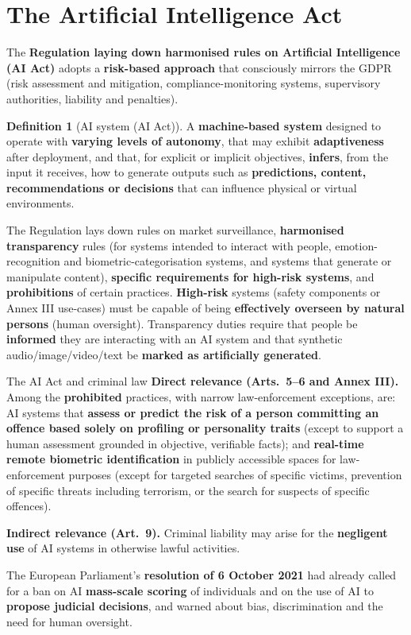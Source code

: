 \documentclass[11pt,a4paper,openany]{report}
\theoremstyle{definition}
\newtheorem{definition}{Definition}[chapter]
\theoremstyle{plain}
\theoremstyle{remark}
\begin{document}
\section{The Artificial Intelligence Act}

The \textbf{Regulation laying down harmonised rules on Artificial Intelligence (AI Act)} adopts a \textbf{risk-based approach} that consciously mirrors the GDPR (risk assessment and mitigation, compliance-monitoring systems, supervisory authorities, liability and penalties).

\begin{definition}[AI system (AI Act)]
A \textbf{machine-based system} designed to operate with \textbf{varying levels of autonomy}, that may exhibit \textbf{adaptiveness} after deployment, and that, for explicit or implicit objectives, \textbf{infers}, from the input it receives, how to generate outputs such as \textbf{predictions, content, recommendations or decisions} that can influence physical or virtual environments.
\end{definition}

The Regulation lays down rules on market surveillance, \textbf{harmonised transparency} rules (for systems intended to interact with people, emotion-recognition and biometric-categorisation systems, and systems that generate or manipulate content), \textbf{specific requirements for high-risk systems}, and \textbf{prohibitions} of certain practices. \textbf{High-risk} systems (safety components or Annex III use-cases) must be capable of being \textbf{effectively overseen by natural persons} (human oversight). Transparency duties require that people be \textbf{informed} they are interacting with an AI system and that synthetic audio/image/video/text be \textbf{marked as artificially generated}.

\begin{sidebox}{The AI Act and criminal law}
\textbf{Direct relevance (Arts.\ 5--6 and Annex III).} Among the \textbf{prohibited} practices, with narrow law-enforcement exceptions, are: AI systems that \textbf{assess or predict the risk of a person committing an offence based solely on profiling or personality traits} (except to support a human assessment grounded in objective, verifiable facts); and \textbf{real-time remote biometric identification} in publicly accessible spaces for law-enforcement purposes (except for targeted searches of specific victims, prevention of specific threats including terrorism, or the search for suspects of specific offences).

\textbf{Indirect relevance (Art.\ 9).} Criminal liability may arise for the \textbf{negligent use} of AI systems in otherwise lawful activities.

The European Parliament's \textbf{resolution of 6 October 2021} had already called for a ban on AI \textbf{mass-scale scoring} of individuals and on the use of AI to \textbf{propose judicial decisions}, and warned about bias, discrimination and the need for human oversight.
\end{sidebox}
\end{document}
